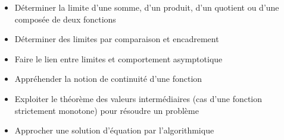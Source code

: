\begin{acquis}
\begin{itemize}
\item Déterminer la limite d’une somme,
d’un produit, d’un \mbox{quotient} ou d’une
composée de deux fonctions
\item Déterminer des limites par
comparaison et encadrement
\item Faire le lien entre limites et comportement asymptotique
\item Appréhender la notion de continuité d'une fonction
\item Exploiter le théorème des valeurs
intermédiaires (cas d'une
fonction strictement monotone) pour
résoudre un problème
\item Approcher une solution d'équation par l'algorithmique
\end{itemize}
\end{acquis}


